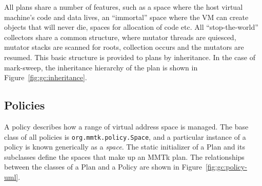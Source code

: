 All \mmtk plans share a number of features, such as a space where the host
virtual machine's code and data lives, an ``immortal'' space where the VM can
create objects that will never die, spaces for allocation of code etc.  All
``stop-the-world'' collectors share a common structure, where mutator threads
are quiesced, mutator stacks are scanned for roots, collection occurs and the
mutators are resumed.  This basic structure is provided to \mmtk plans by
inheritance.  In the case of mark-sweep, the inheritance hierarchy of the plan
is shown in Figure~\ref{fig:gc:inheritance}.


\begin{sidewaysfigure}

\caption{Inheritance hierarchy of the mark-sweep plan.}
\label{fig:gc:inheritance}
\end{sidewaysfigure}

\subsection{Policies}

\begin{sidewaysfigure}

\caption{Class relations between plans and policies.  The diagram shows a
subset of the relationships, illustrating two spaces: the small code space,
defined in the Plan for all MMTk plans, and the main mark-sweep space.}
\label{fig:gc:policy-uml}
\end{sidewaysfigure}

A policy describes how a range of virtual address space is managed.  
The base class of all policies is \lstinline|org.mmtk.policy.Space|, and a
particular instance of a policy is known generically as a \emph{space}.  
The static initializer of a Plan and its subclasses define the spaces that 
make up an MMTk plan.  The relationships between the classes of a Plan and a
Policy are shown in Figure~{\ref{fig:gc:policy-uml}}.
 
